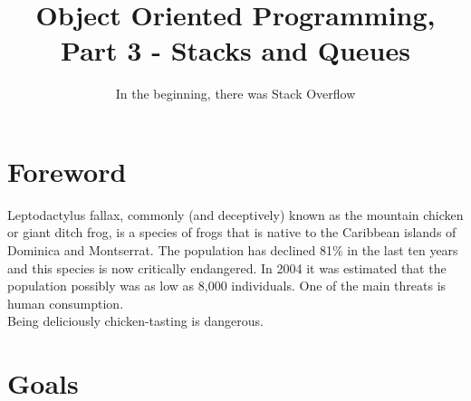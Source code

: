 \documentclass{42-en}
\begin{document}
				
				
		\title{Object Oriented Programming, Part 3 - Stacks and Queues}
        \subtitle{In the beginning, there was Stack Overflow}


\maketitle

\tableofcontents


\chapter{Foreword}

	Leptodactylus fallax, commonly (and deceptively) known as the mountain 
	chicken or giant ditch frog, is a species of frogs that is native to the
	Caribbean islands of Dominica and Montserrat. The population has declined 
	81\% in the last ten years and this species is now critically endangered. 
	In 2004 it was estimated that the population possibly was as low as 8,000 individuals.
	One of the main threats is human consumption. \\
	
	Being deliciously chicken-tasting is dangerous. \\

\chapter{Goals}
\end{document}

